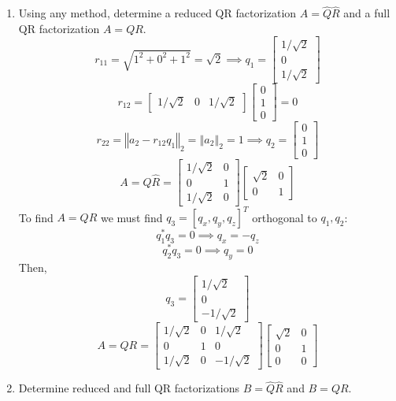 \documentclass[12pt]{article}
\numberwithin{equation}{section}
\newcommand{\norm}[1]{\left\Vert#1\right\Vert}
\begin{document}
\begin{enumerate}
    \begin{enumerate}
    \item Using any method, determine a reduced QR factorization $A=\hat{Q}\hat{R}$ and a full QR factorization $A=QR$.
        $$r_{11}=\sqrt{1^2+0^2+1^2}=\sqrt{2}\implies q_1=\left[\begin{array}{c}1/\sqrt{2}\\0\\1/\sqrt{2}\end{array}\right]$$
        $$r_{12}=\left[\begin{array}{ccc}1/\sqrt{2}&0&1/\sqrt{2}\end{array}\right]\left[\begin{array}{c}0\\1\\0\end{array}\right]=0$$
        $$r_{22}=\norm{a_2-r_{12}q_1}_2=\norm{a_2}_2=1\implies q_2=\left[\begin{array}{c}0\\1\\0\end{array}\right]$$
        $$A=\hat{Q}\hat{R}=\left[\begin{array}{cc}1/\sqrt{2}&0\\0&1\\1/\sqrt{2}&0\end{array}\right] \left[\begin{array}{cc}\sqrt{2}&0\\0&1\end{array}\right]$$
        To find $A=QR$ we must find $q_3=[q_x,q_y,q_z]^T$ orthogonal to $q_1,q_2$:
        $$q_1^*q_3=0\implies q_x=-q_z$$
        $$q_2^*q_3=0\implies q_y=0$$
        Then,
        $$q_3=\left[\begin{array}{c}1/\sqrt{2}\\0\\-1/\sqrt{2}\end{array}\right]$$
        $$A=QR=\left[\begin{array}{ccc}1/\sqrt{2}&0&1/\sqrt{2}\\0&1&0\\1/\sqrt{2}&0&-1/\sqrt{2}\end{array}\right] \left[\begin{array}{cc}\sqrt{2}&0\\0&1\\0&0\end{array}\right]$$
    \item Determine reduced and full QR factorizations $B=\hat{Q}\hat{R}$ and $B=QR$.

\end{enumerate}
\end{enumerate}
\end{document}
